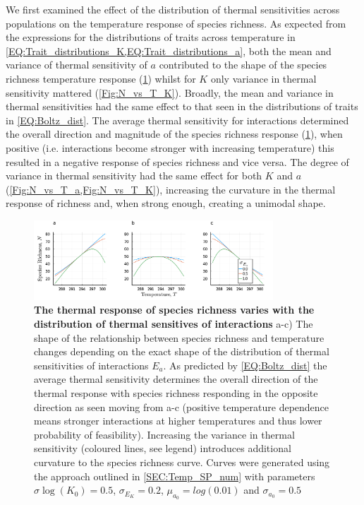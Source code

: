 \documentclass{article}
\begin{document}
We first examined the effect of the distribution of thermal sensitivities across populations on the temperature response of species richness. As expected from the expressions for the distributions of traits across temperature in \cref{EQ:Trait_distributions_K,EQ:Trait_distributions_a}, both the mean and variance of thermal sensitivity of $a$ contributed to the shape of the species richness temperature response (\cref{Fig:N_vs_T_a}) whilst for $K$ only variance in thermal sensitivity mattered (\cref{Fig:N_vs_T_K}). Broadly, the mean and variance in thermal sensitivities had the same effect to that seen in the distributions of traits in \cref{EQ:Boltz_dist}. The average thermal sensitivity for interactions determined the overall direction and magnitude of the species richness response (\cref{Fig:N_vs_T_a}), when positive (i.e. interactions become stronger with increasing temperature) this resulted in a negative response of species richness and vice versa. The degree of variance in thermal sensitivity had the same effect for both $K$ and $a$ (\cref{Fig:N_vs_T_a,Fig:N_vs_T_K}), increasing the curvature in the thermal response of richness and, when strong enough, creating a unimodal shape.

\begin{figure}
    \centering
    \includegraphics[width=0.8\textwidth]{docs/Figures/Fig_Nsp_Temp_a.pdf}
    \caption{\textbf{The thermal response of species richness  varies with the distribution of thermal sensitives of interactions} a-c) The shape of the relationship between species richness and temperature changes depending on the exact shape of the distribution of thermal sensitivities of interactions $E_a$. As predicted by \cref{EQ:Boltz_dist} the average thermal sensitivity determines the overall direction of the thermal response with species richness responding in the opposite direction as seen moving from a-c (positive temperature dependence means stronger interactions at higher temperatures and thus lower probability of feasibility). Increasing the variance in thermal sensitivity (coloured lines, see legend) introduces additional curvature to the species richness curve. Curves were generated using the approach outlined in \cref{SEC:Temp_SP_num} with parameters $\sigma{\log(K_0)} = 0.5$, $\sigma_{E_K} = 0.2$, $\mu_{a_0} = log(0.01)$ and  $\sigma_{a_0} = 0.5$}
    \label{Fig:N_vs_T_a}
\end{figure}
\end{document}
